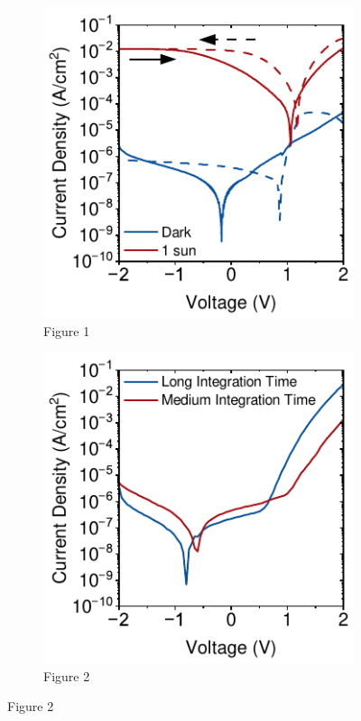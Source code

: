 \begin{figure}[htbp]
    \centering

    \begin{subfigure}[b]{0.45\textwidth}
        \centering
        \includegraphics[width=\textwidth]{chapters/material_properties/images/Forward-Reverse-Plot.pdf}
        \caption{Figure 1}
    \end{subfigure}
    \hfill
    \begin{subfigure}[b]{0.45\textwidth}
        \centering
        \includegraphics[width=\textwidth]{chapters/material_properties/images/Integration-Speed.pdf}
        \caption{Figure 2}
    \end{subfigure}


\end{figure}
